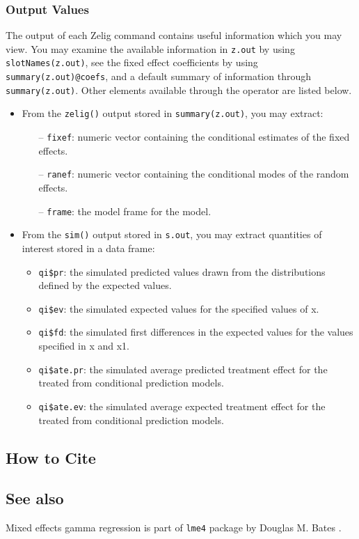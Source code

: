\begin{itemize}
\end{itemize}

\subsubsection{Output Values}
The output of each Zelig command contains useful information which you may view. You may examine the available information in {\tt z.out} by using {\tt slotNames(z.out)}, see the fixed effect coefficients by using {\tt summary(z.out)@coefs}, and a default summary of information through {\tt summary(z.out)}. Other elements available through the {\tt \@} operator are listed below.
\begin{itemize}
\item From the {\tt zelig()} output stored in {\tt summary(z.out)}, you may extract:
\begin{itemize}
\item[--] {\tt fixef}: numeric vector containing the conditional estimates of the fixed effects.
\item[--] {\tt ranef}: numeric vector containing the conditional modes of the random effects.
\item[--] {\tt frame}: the model frame for the model.
\end{itemize}
\item From the {\tt sim()} output stored in {\tt s.out}, you may extract quantities of interest stored in a data frame:
\begin{itemize}
\item {\tt qi\$pr}: the simulated predicted values drawn from the distributions defined by the expected values.
\item {\tt qi\$ev}: the simulated expected values for the specified values of x.
\item {\tt qi\$fd}: the simulated first differences in the expected values for the values specified in x and x1.
\item {\tt qi\$ate.pr}: the simulated average predicted treatment effect for the treated from conditional prediction models.
\item {\tt qi\$ate.ev}: the simulated average expected treatment effect for the treated from conditional prediction models.
\end{itemize}
\end{itemize}


\subsection* {How to Cite}




\subsection* {See also}
Mixed effects gamma regression is part of {\tt lme4} package by Douglas M. Bates \citep{Bates07}.
